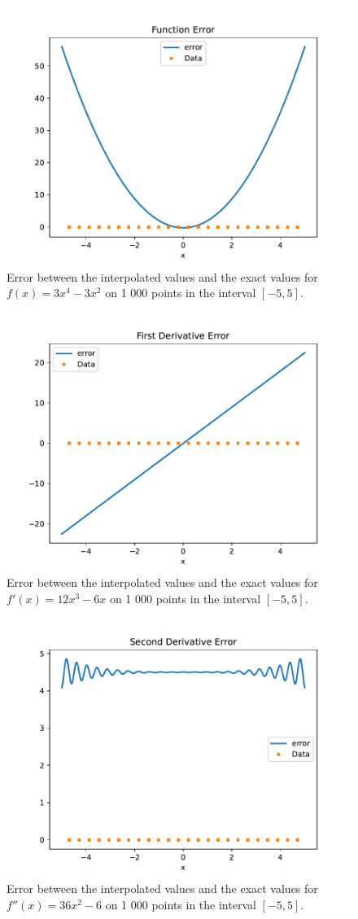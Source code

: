 \documentclass[11pt]{article}
\begin{document}
\begin{enumerate}
    \begin{figure}[h]
        \begin{center}
            \includegraphics[width=.6\textwidth]{Plots/q2a1.pdf}
            \caption{Error between the interpolated values and the exact values for $f(x)=3x^4-3x^2$ on 1 000 points in the interval $[-5,5]$.}
            \label{fig:q2a1}
        \end{center}
    \end{figure}

    \begin{figure}[h]
        \begin{center}
            \includegraphics[width=.6\textwidth]{Plots/q2a2.pdf}
            \caption{Error between the interpolated values and the exact values for $f'(x)=12x^3-6x$ on 1 000 points in the interval $[-5,5]$.}
            \label{fig:q2a2}
        \end{center}
    \end{figure}

    \begin{figure}[h]
        \begin{center}
            \includegraphics[width=.6\textwidth]{Plots/q2a3.pdf}
            \caption{Error between the interpolated values and the exact values for $f''(x)=36x^2-6$ on 1 000 points in the interval $[-5,5]$.}
            \label{fig:q2a3}
        \end{center}
    \end{figure}
    

\end{enumerate}
\end{document}
